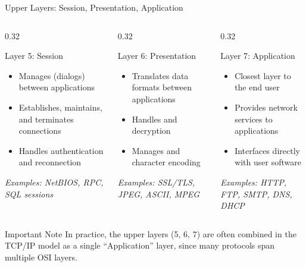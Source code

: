 \documentclass[aspectratio=169]{beamer}  %
\begin{document}
\begin{frame}{Upper Layers: Session, Presentation, Application}
    \begin{columns}[T]
        \begin{column}{0.32\textwidth}
            \begin{block}{Layer 5: Session}
                \begin{itemize}
                    \small
                    \item Manages  (dialogs) between applications
                    \item Establishes, maintains, and terminates connections
                    \item Handles authentication and reconnection
                \end{itemize}
                \textit{Examples: NetBIOS, RPC, SQL sessions}
            \end{block}
        \end{column}
        \begin{column}{0.32\textwidth}
            \begin{block}{Layer 6: Presentation}
                \begin{itemize}
                    \item Translates data formats between applications
                    \item Handles  and decryption
                    \item Manages  and character encoding
                \end{itemize}
                \vspace{0.3em}
                \textit{Examples: SSL/TLS, JPEG, ASCII, MPEG}
            \end{block}
        \end{column}
        \begin{column}{0.32\textwidth}
            \begin{block}{Layer 7: Application}
                \begin{itemize}
                    \item Closest layer to the end user
                    \item Provides network services to applications
                    \item Interfaces directly with user software
                \end{itemize}
                \vspace{0.3em}
                \textit{Examples: HTTP, FTP, SMTP, DNS, DHCP}
            \end{block}
        \end{column}
    \end{columns}
    
    \begin{alertblock}{Important Note}
        \scriptsize
        In practice, the upper layers (5, 6, 7) are often combined in the TCP/IP model as a single ``Application'' layer, since many protocols span multiple OSI layers.
    \end{alertblock}
\end{frame}
\end{document}
